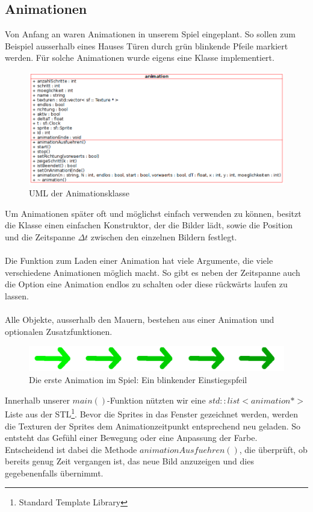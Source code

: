 \documentclass[11pt,a4paper]{scrbook}
\begin{document}
\subsection{Animationen}
Von Anfang an waren Animationen in unserem Spiel eingeplant. So sollen zum Beispiel ausserhalb eines Hauses
Türen durch grün blinkende Pfeile markiert werden. Für solche Animationen wurde eigens eine Klasse implementiert.
\begin{figure}[h]
    \centering
    \includegraphics[scale=0.6]{img/animation_uml.png}
    \caption{UML der Animationsklasse}
\end{figure}
Um Animationen später oft und möglichst einfach verwenden zu können, besitzt die Klasse einen einfachen Konstruktor,
der die Bilder lädt, sowie die Position und die Zeitspanne $\Delta t$ zwischen den einzelnen Bildern festlegt.\\
\\
Die Funktion zum Laden einer Animation hat viele Argumente, die viele verschiedene Animationen möglich macht. So gibt es neben der Zeitspanne auch die Option eine Animation endlos zu schalten oder diese rückwärts laufen zu lassen.\\
\\
Alle Objekte, ausserhalb den Mauern, bestehen aus einer Animation und optionalen Zusatzfunktionen.
\begin{figure}[h]
    \centering
    \includegraphics[scale=0.3]{img/animation_pfeil.png}
    \caption{Die erste Animation im Spiel: Ein blinkender Einstiegspfeil}
\end{figure}
Innerhalb unserer $main()$-Funktion nützten wir eine $std::list<animation *>$ Liste aus der STL\footnote{Standard Template Library}.
Bevor die Sprites in das Fenster gezeichnet werden, werden die Texturen der Sprites dem Animationzeitpunkt entsprechend
neu geladen. So entsteht das Gefühl einer Bewegung oder eine Anpassung der Farbe. Entscheidend ist dabei die Methode
$animationAusfuehren()$, die überprüft, ob bereits genug Zeit vergangen ist, das neue Bild anzuzeigen und dies gegebenenfalls
übernimmt.
\end{document}
